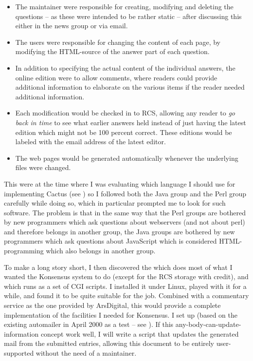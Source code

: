 \begin{itemize}
\item The maintainer were responsible for creating, modifying and
  deleting the questions -- as these were intended to be rather static
  -- after discussing this either in the news group or via email.
  
\item The users were responsible for changing the content of each
page, by modifying the HTML-source of the answer part of each
question.

\item In addition to specifying the actual content of the individual
  answers, the online edition were to allow comments, where readers
  could provide additional information to elaborate on the various
  items if the reader needed additional information.
  
\item Each modification would be checked in to RCS, allowing any
  reader to \textit{go back in time} to see what earlier answers held
  instead of just having the latest edition which might not be 100
  percent correct.  These editions would be labeled with the email
  address of the latest editor.
  
\item The web pages would be generated automatically whenever the
  underlying files were changed.
  
\end{itemize}

This were at the time where I was evaluating which language I should
use for implementing Cactus (see ) so I
followed both the Java group and the Perl group carefully while doing
so, which in particular prompted me to look for such software.  The
problem is that in the same way that the Perl groups are bothered by
new programmers which ask questions about webservers (and not about
perl) and therefore belongs in another group, the Java groups are
bothered by new programmers which ask questions about JavaScript which
is considered HTML-programming which also belongs in another group.


To make a long story short, I then discovered the
which does most of what I wanted the Konsensus system to do (except
for the RCS storage with credit), and which runs as a set of CGI
scripts.  I installed it under Linux, played with it for a while, and
found it to be quite suitable for the job.  Combined with a commentary
service as the one provided by ArsDigital, this would provide a
complete implementation of the facilities I needed for Konsensus.  I
set up  (based on the existing
automailer in April 2000 as a test -- see
).  If this
any-body-can-update-information concept work well, I will write a
script that updates the generated mail from the submitted entries,
allowing this document to be entirely user-supported without the need
of a maintainer.

  
